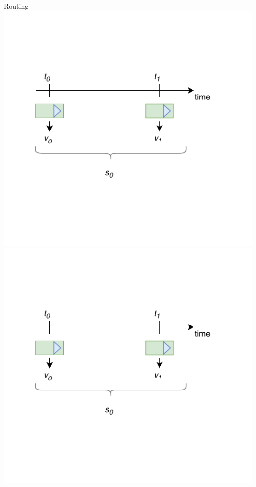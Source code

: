 \documentclass{beamer}
\begin{document}
\begin{frame}{Routing}
\centering
\includegraphics[page=5,scale=0.55]{sources/Rounting_1.pdf}
\includegraphics[page=1,scale=0.55]{sources/Rounting_1.pdf}
\end{frame}
\end{document}
